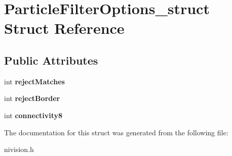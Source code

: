 \hypertarget{structParticleFilterOptions__struct}{
\section{ParticleFilterOptions\_\-struct Struct Reference}
\label{structParticleFilterOptions__struct}
}
\subsection*{Public Attributes}
\begin{DoxyCompactItemize}
\item 
\hypertarget{structParticleFilterOptions__struct_a2956a16d57d276b2bced58c5e89cb2c6}{
int {\bfseries rejectMatches}}
\label{structParticleFilterOptions__struct_a2956a16d57d276b2bced58c5e89cb2c6}

\item 
\hypertarget{structParticleFilterOptions__struct_a614fe41999a0e2759f97e7c516a476a0}{
int {\bfseries rejectBorder}}
\label{structParticleFilterOptions__struct_a614fe41999a0e2759f97e7c516a476a0}

\item 
\hypertarget{structParticleFilterOptions__struct_a6c57b16dcd2f52ce159c0576108dbddb}{
int {\bfseries connectivity8}}
\label{structParticleFilterOptions__struct_a6c57b16dcd2f52ce159c0576108dbddb}

\end{DoxyCompactItemize}


The documentation for this struct was generated from the following file:\begin{DoxyCompactItemize}
\item 
nivision.h\end{DoxyCompactItemize}
